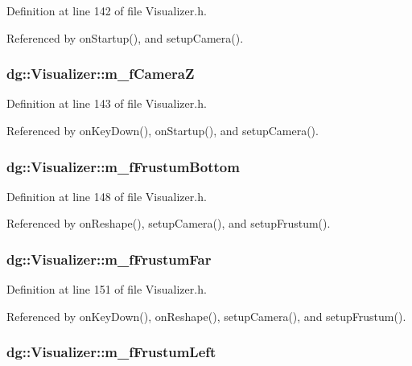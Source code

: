 Definition at line 142 of file Visualizer.h.

Referenced by on\-Startup(), and setup\-Camera().
\subsubsection{ dg::Visualizer::m\_\-f\-Camera\-Z\hspace{0.3cm}{\tt  [protected]}}\label{classdg_1_1Visualizer_n35}




Definition at line 143 of file Visualizer.h.

Referenced by on\-Key\-Down(), on\-Startup(), and setup\-Camera().
\subsubsection{ dg::Visualizer::m\_\-f\-Frustum\-Bottom\hspace{0.3cm}{\tt  [protected]}}\label{classdg_1_1Visualizer_n38}




Definition at line 148 of file Visualizer.h.

Referenced by on\-Reshape(), setup\-Camera(), and setup\-Frustum().
\subsubsection{ dg::Visualizer::m\_\-f\-Frustum\-Far\hspace{0.3cm}{\tt  [protected]}}\label{classdg_1_1Visualizer_n41}




Definition at line 151 of file Visualizer.h.

Referenced by on\-Key\-Down(), on\-Reshape(), setup\-Camera(), and setup\-Frustum().
\subsubsection{ dg::Visualizer::m\_\-f\-Frustum\-Left\hspace{0.3cm}{\tt  [protected]}}\label{classdg_1_1Visualizer_n36}




